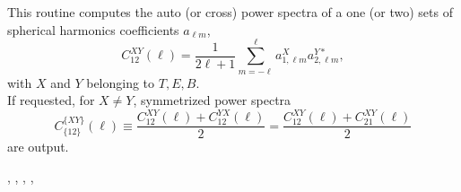 
\sloppy


\section[alm2cl*]{ }
\label{sub:alm2cl}
\author{Eric Hivon}

\begin{facility}
{This routine computes the auto (or cross) power spectra of a one (or two) sets of spherical harmonics
  coefficients $a_{\ell m}$,
\begin{equation}
C_{12}^{XY}(\ell) = \frac{1}{2 \ell +1}
\sum_{m=-\ell}^{\ell} a_{1,\ell m}^X
  a_{2,\ell m}^{Y*},
\end{equation}
with $X$ and $Y$ belonging to $T,E,B$. \\
If requested, for $X \ne Y$, symmetrized power spectra
\begin{equation}
  C_{\{12\}}^{\{XY\}}(\ell) \equiv \frac{C_{12}^{XY}(\ell)+C_{12}^{YX}(\ell)}{2} = \frac{C_{12}^{XY}(\ell)+C_{21}^{XY}(\ell)}{2}
\end{equation}
are output.


}
{\modAlmTools}
\end{facility}

\begin{f90format}
{%
, %
, %
,  %
, %
}
\end{f90format}
\aboutoptional

